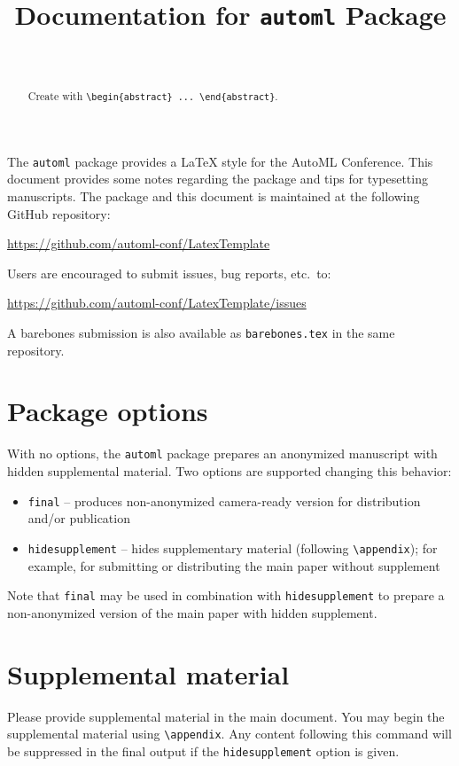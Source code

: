 \documentclass[11pt]{article}
\title{Documentation for \texttt{automl} Package}
\author[1]{\nameemail{Author 1}{email1@example.com}}
\author[2,3]{\nameemail{Author 2}{email2@example.com}}
\author[3]{\nameemail{Author 3}{email3@example.com}}
\author[4]{\nameemail{Author 4}{email4@example.com}}
\author[3]{\\\nameemail{Author 5}{email5@example.com}}
\affil[1]{Institution 1}
\affil[2]{Institution 2}
\affil[3]{Institution 3}
\affil[4]{Institution 4}
\begin{document}
\maketitle

\begin{abstract}
  Create with \verb|\begin{abstract} ... \end{abstract}|.
\end{abstract}

The \texttt{automl} package provides a \LaTeX{} style for the AutoML Conference.
This document provides some notes regarding the package and tips for typesetting
manuscripts. The package and this document is maintained at the following GitHub
repository:
\begin{center}
  \url{https://github.com/automl-conf/LatexTemplate}
\end{center}
Users are encouraged to submit issues, bug reports, etc.\ to:
\begin{center}
  \url{https://github.com/automl-conf/LatexTemplate/issues}
\end{center}
A barebones submission is also available as \texttt{barebones.tex} in the same
repository.

\section{Package options}

With no options, the \texttt{automl} package prepares an anonymized manuscript
with hidden supplemental material. Two options are supported changing this
behavior:
\begin{itemize}
\item \texttt{final} -- produces non-anonymized camera-ready version for
  distribution and/or publication
\item \texttt{hidesupplement} -- hides supplementary material (following
  \verb|\appendix|); for example, for submitting or distributing the main paper
  without supplement
\end{itemize}
Note that \texttt{final} may be used in combination with  \texttt{hidesupplement}
to prepare a non-anonymized version of the main paper with hidden supplement.

\section{Supplemental material}

Please provide supplemental material in the main document. You may begin the
supplemental material using \verb|\appendix|. Any content following this command
will be suppressed in the final output if the \texttt{hidesupplement} option is
given.
\end{document}
